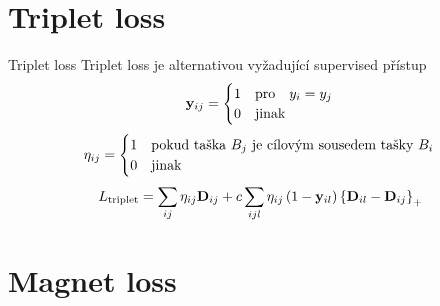 \documentclass[10pt]{beamer}
\newcommand{\mathmat}{\ensuremath{\mathbf}}
\begin{document}
\section{Triplet loss}

\begin{frame}{Triplet loss}
	Triplet loss je alternativou vyžadující supervised přístup
	\[ \mathmat{y}_{ij} =
\begin{cases}
	1 &\text{pro} \quad y_i = y_j \\
	0 &\text{jinak}
\end{cases}
\]
\[ \mathmat{\eta}_{ij} = \begin{cases}
		1 &\text{pokud taška } B_j \text{ je cílovým sousedem tašky } B_i \\
		0 &\text{jinak}
  \end{cases} \]
\[ L_\mathrm{triplet} = \sum_{ij} \eta_{ij} \mathmat{D}_{ij} + c \sum_{ijl} \eta_{ij} \left( 1 - \mathmat{y}_{il} \right) \left\{ \mathmat{D}_{il} - \mathmat{D}_{ij} \right\}_+ \]
\end{frame}

\section{Magnet loss}
\end{document}
